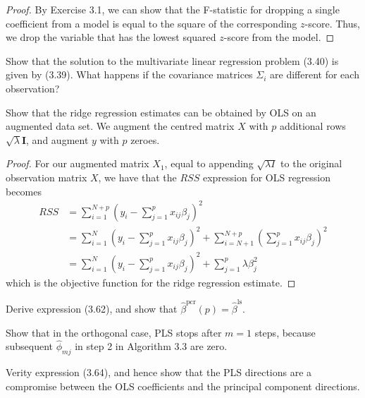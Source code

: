 \begin{proof}
    By Exercise 3.1, we can show that the F-statistic for dropping a single coefficient from a model is equal to the square of the corresponding $z$-score.  Thus, we drop the variable that has the lowest squared $z$-score from the model.
\end{proof}

\begin{exer}
    Show that the solution to the multivariate linear regression problem (3.40) is given by (3.39).  What happens if the covariance matrices $\Sigma_i$ are different for each observation?
\end{exer}

\begin{exer}
    Show that the ridge regression estimates can be obtained by OLS on an augmented data set.  We augment the centred matrix $X$ with $p$ additional rows $\sqrt{\lambda} \mathbf{I}$, and augment $y$ with $p$ zeroes. 

\end{exer}
\begin{proof}
    For our augmented matrix $X_1$, equal to appending $\sqrt{\lambda I}$ to the original observation matrix $X$, we have that the $RSS$ expression for OLS regression becomes \begin{align*}
        RSS &= \sum_{i=1}^{N+p} \left(y_i - \sum_{j=1}^p x_{ij} \beta_j \right)^2 \\
            &= \sum_{i=1}^{N} \left( y_i - \sum_{j=1}^p x_{ij} \beta_j \right)^2 + \sum_{i = N + 1}^{N+p} \left(\sum_{j=1}^p x_{ij} \beta_j \right)^2 \\
            &= \sum_{i=1}^{N} \left( y_i - \sum_{j=1}^p x_{ij} \beta_j \right)^2 + \sum_{j=1}^p \lambda \beta_j^2 
    \end{align*} which is the objective function for the ridge regression estimate.
\end{proof}

\begin{exer}
    Derive expression (3.62), and show that $\hat \beta^{\text{pcr}}(p) = \hat \beta^{\text{ls}}$.
\end{exer}

\begin{exer}
    Show that in the orthogonal case, PLS stops after $m=1$ steps, because subsequent $\hat \phi_{mj}$ in step 2 in Algorithm 3.3 are zero.
\end{exer}

\begin{exer}
    Verity expression (3.64), and hence show that the PLS directions are a compromise between the OLS coefficients and the principal component directions.
\end{exer}

